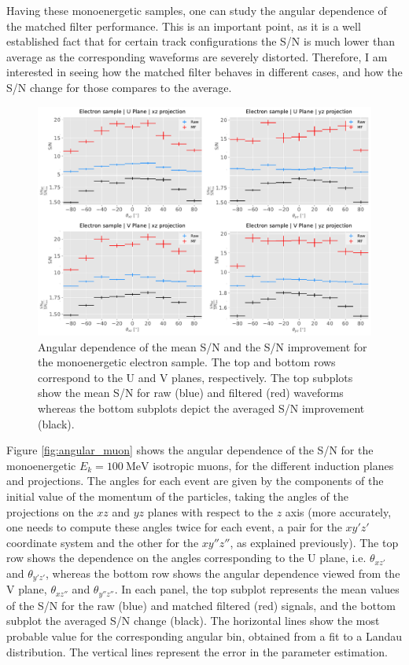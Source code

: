 Having these monoenergetic samples, one can study the angular dependence of the matched filter performance. This is an important point, as it is a well established fact that for certain track configurations the S/N is much lower than average as the corresponding waveforms are severely distorted. Therefore, I am interested in seeing how the matched filter behaves in different cases, and how the S/N change for those compares to the average.

\begin{figure}[t]
	\centering
	\includegraphics[width=0.9\linewidth]{Images/Matched_Filter/larsoft_electron_angular_alt.pdf}
	\caption[Angular dependence of the mean S/N and the S/N improvement for the monoenergetic electron sample.]{Angular dependence of the mean S/N and the S/N improvement for the monoenergetic electron sample. The top and bottom rows correspond to the U and V planes, respectively. The top subplots show the mean S/N for raw (blue) and filtered (red) waveforms whereas the bottom subplots depict the averaged S/N improvement (black).}
	\label{fig:angular_electron}
\end{figure}

Figure \ref{fig:angular_muon} shows the angular dependence of the S/N for the monoenergetic $E_{k}=100 \ \mathrm{MeV}$ isotropic muons, for the different induction planes and projections. The angles for each event are given by the components of the initial value of the momentum of the particles, taking the angles of the projections on the $xz$ and $yz$ planes with respect to the $z$ axis (more accurately, one needs to compute these angles twice for each event, a pair for the $xy'z'$ coordinate system and the other for the $xy''z''$, as explained previously). The top row shows the dependence on the angles corresponding to the U plane, i.e. $\theta_{xz'}$ and $\theta_{y'z'}$, whereas the bottom row shows the angular dependence viewed from the V plane, $\theta_{xz''}$ and $\theta_{y''z''}$. In each panel, the top subplot represents the mean values of the S/N for the raw (blue) and matched filtered (red) signals, and the bottom subplot the averaged S/N change (black). The horizontal lines show the most probable value for the corresponding angular bin, obtained from a fit to a Landau distribution. The vertical lines represent the error in the parameter estimation.

